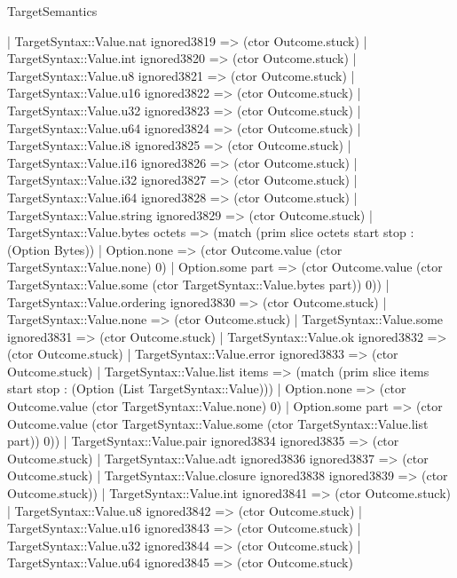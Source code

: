 \begin{lexlean}{TargetSemantics}
\begin{semanticmodule}
{                  | TargetSyntax::Value.nat ignored3819 => (ctor Outcome.stuck)
                  | TargetSyntax::Value.int ignored3820 => (ctor Outcome.stuck)
                  | TargetSyntax::Value.u8 ignored3821 => (ctor Outcome.stuck)
                  | TargetSyntax::Value.u16 ignored3822 => (ctor Outcome.stuck)
                  | TargetSyntax::Value.u32 ignored3823 => (ctor Outcome.stuck)
                  | TargetSyntax::Value.u64 ignored3824 => (ctor Outcome.stuck)
                  | TargetSyntax::Value.i8 ignored3825 => (ctor Outcome.stuck)
                  | TargetSyntax::Value.i16 ignored3826 => (ctor Outcome.stuck)
                  | TargetSyntax::Value.i32 ignored3827 => (ctor Outcome.stuck)
                  | TargetSyntax::Value.i64 ignored3828 => (ctor Outcome.stuck)
                  | TargetSyntax::Value.string ignored3829 => (ctor Outcome.stuck)
                  | TargetSyntax::Value.bytes octets => (match (prim slice octets start stop : (Option Bytes))
                    | Option.none => (ctor Outcome.value (ctor TargetSyntax::Value.none) 0)
                    | Option.some part => (ctor Outcome.value (ctor TargetSyntax::Value.some (ctor TargetSyntax::Value.bytes part)) 0))
                  | TargetSyntax::Value.ordering ignored3830 => (ctor Outcome.stuck)
                  | TargetSyntax::Value.none => (ctor Outcome.stuck)
                  | TargetSyntax::Value.some ignored3831 => (ctor Outcome.stuck)
                  | TargetSyntax::Value.ok ignored3832 => (ctor Outcome.stuck)
                  | TargetSyntax::Value.error ignored3833 => (ctor Outcome.stuck)
                  | TargetSyntax::Value.list items => (match (prim slice items start stop : (Option (List TargetSyntax::Value)))
                    | Option.none => (ctor Outcome.value (ctor TargetSyntax::Value.none) 0)
                    | Option.some part => (ctor Outcome.value (ctor TargetSyntax::Value.some (ctor TargetSyntax::Value.list part)) 0))
                  | TargetSyntax::Value.pair ignored3834 ignored3835 => (ctor Outcome.stuck)
                  | TargetSyntax::Value.adt ignored3836 ignored3837 => (ctor Outcome.stuck)
                  | TargetSyntax::Value.closure ignored3838 ignored3839 => (ctor Outcome.stuck))
                | TargetSyntax::Value.int ignored3841 => (ctor Outcome.stuck)
                | TargetSyntax::Value.u8 ignored3842 => (ctor Outcome.stuck)
                | TargetSyntax::Value.u16 ignored3843 => (ctor Outcome.stuck)
                | TargetSyntax::Value.u32 ignored3844 => (ctor Outcome.stuck)
                | TargetSyntax::Value.u64 ignored3845 => (ctor Outcome.stuck)
}
\end{semanticmodule}
\end{lexlean}
